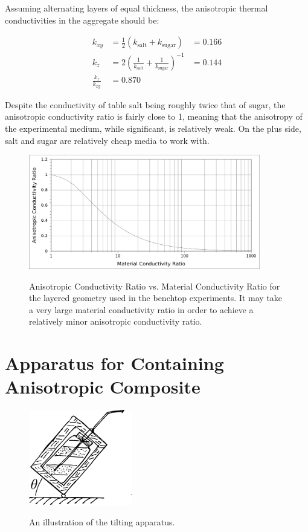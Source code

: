 
Assuming alternating layers of equal thickness, the anisotropic thermal
conductivities in the aggregate should be:

\begin{align}
k_{xy} &= \frac12 \left( k_{\textrm{salt}} + k_{\textrm{sugar}} \right) &= \boxed{0.166}\\
k_z &= 2 \left( \frac1{k_{\textrm{salt}}} + \frac1{k_{\textrm{sugar}}} \right)^{-1} &= \boxed{0.144}\\
\frac{k_z}{k_{xy}} &= \boxed{0.870}
\end{align}

Despite the conductivity of table salt being roughly twice that of sugar, the
anisotropic conductivity ratio is fairly close to 1, meaning that the anisotropy
of the experimental medium, while significant, is relatively weak. On the plus
side, salt and sugar are relatively cheap media to work with.

\begin{figure}[h]
\centering
\includegraphics[width=0.9\textwidth]{fig/anisovmaterial_ratios.png}
\label{fig:anisovmatl_rats}
\caption{Anisotropic Conductivity Ratio vs. Material Conductivity Ratio for the
layered geometry used in the benchtop experiments. It may take a very large
material conductivity ratio in order to achieve a relatively minor anisotropic
conductivity ratio.}
\end{figure}

\section{Apparatus for Containing Anisotropic Composite}

\begin{figure}[h]
\centering
\includegraphics[width=0.4\textwidth]{fig/tilter.png}
\label{fig:tilter}
\caption{An illustration of the tilting apparatus.}
\end{figure}

